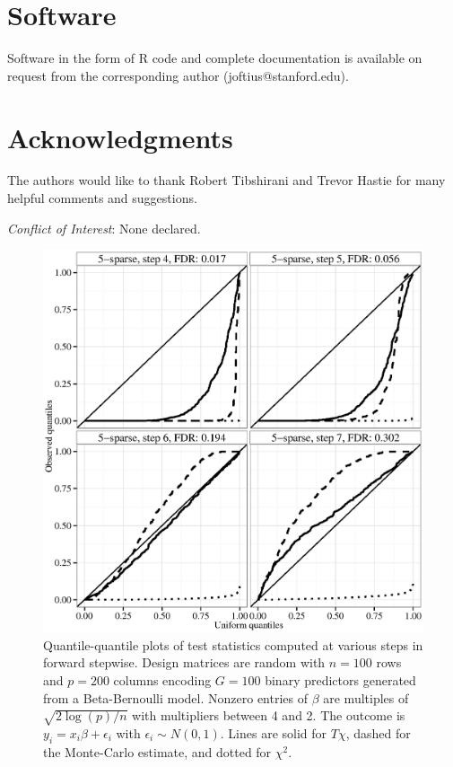 \documentclass[oupdraft]{bio}
\begin{document}
\section{Software}
\label{sec5}

Software in the form of R code and complete documentation is available on request from the corresponding author (joftius@stanford.edu).





\section*{Acknowledgments}
The authors would like to thank Robert Tibshirani and Trevor Hastie for many helpful comments and suggestions.

{\it Conflict of Interest}: None declared.





\begin{figure}
\begin{center}
\includegraphics[width=.9\textwidth]{nonnull_G100_high4_binary.eps}
\caption{Quantile-quantile plots of test statistics computed at various steps in forward stepwise. Design matrices are random with $n = 100$ rows and $p = 200$ columns encoding $G = 100$ binary predictors generated from a Beta-Bernoulli model. Nonzero entries of $\beta$ are multiples of $\sqrt{2 \log (p)/n}$ with multipliers between 4 and 2. The outcome is $y_i = x_i\beta + \epsilon_i$ with $\epsilon_i \sim N(0,1)$. Lines are solid for $T\chi$, dashed for the Monte-Carlo estimate, and dotted for $\chi^2$.}
\label{fig:binary}
\end{center}
\end{figure}
\end{document}

